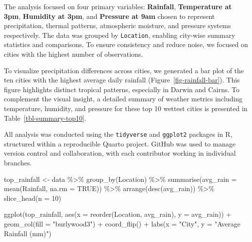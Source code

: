 \documentclass[
  letterpaper,
  DIV=11,
  numbers=noendperiod]{scrartcl}
\newenvironment{Shaded}{\begin{snugshade}}{\end{snugshade}}
\newcommand{\AttributeTok}[1]{\textcolor[rgb]{0.40,0.45,0.13}{#1}}
\newcommand{\ConstantTok}[1]{\textcolor[rgb]{0.56,0.35,0.01}{#1}}
\newcommand{\DecValTok}[1]{\textcolor[rgb]{0.68,0.00,0.00}{#1}}
\newcommand{\FunctionTok}[1]{\textcolor[rgb]{0.28,0.35,0.67}{#1}}
\newcommand{\NormalTok}[1]{\textcolor[rgb]{0.00,0.23,0.31}{#1}}
\newcommand{\OtherTok}[1]{\textcolor[rgb]{0.00,0.23,0.31}{#1}}
\newcommand{\SpecialCharTok}[1]{\textcolor[rgb]{0.37,0.37,0.37}{#1}}
\newcommand{\StringTok}[1]{\textcolor[rgb]{0.13,0.47,0.30}{#1}}
\begin{document}
The analysis focused on four primary variables: \textbf{Rainfall},
\textbf{Temperature at 3pm}, \textbf{Humidity at 3pm}, and
\textbf{Pressure at 9am} chosen to represent precipitation, thermal
patterns, atmospheric moisture, and pressure systems respectively. The
data was grouped by \texttt{Location}, enabling city-wise summary
statistics and comparisons. To ensure consistency and reduce noise, we
focused on cities with the highest number of observations.

To visualize precipitation differences across cities, we generated a bar
plot of the ten cities with the highest average daily rainfall
(Figure~\ref{fig-rainfall-bar}). This figure highlights distinct
tropical patterns, especially in Darwin and Cairns. To complement the
visual insight, a detailed summary of weather metrics including
temperature, humidity, and pressure for these top 10 wettest cities is
presented in Table~\ref{tbl-summary-top10}.

All analysis was conducted using the \texttt{tidyverse} and
\texttt{ggplot2} packages in R, structured within a reproducible Quarto
project. GitHub was used to manage version control and collaboration,
with each contributor working in individual branches.

\begin{Shaded}
\begin{Highlighting}[]
\NormalTok{top\_rainfall }\OtherTok{\textless{}{-}}\NormalTok{ data }\SpecialCharTok{\%\textgreater{}\%}
  \FunctionTok{group\_by}\NormalTok{(Location) }\SpecialCharTok{\%\textgreater{}\%}
  \FunctionTok{summarise}\NormalTok{(}\AttributeTok{avg\_rain =} \FunctionTok{mean}\NormalTok{(Rainfall, }\AttributeTok{na.rm =} \ConstantTok{TRUE}\NormalTok{)) }\SpecialCharTok{\%\textgreater{}\%}
  \FunctionTok{arrange}\NormalTok{(}\FunctionTok{desc}\NormalTok{(avg\_rain)) }\SpecialCharTok{\%\textgreater{}\%}
  \FunctionTok{slice\_head}\NormalTok{(}\AttributeTok{n =} \DecValTok{10}\NormalTok{)}

\FunctionTok{ggplot}\NormalTok{(top\_rainfall, }\FunctionTok{aes}\NormalTok{(}\AttributeTok{x =} \FunctionTok{reorder}\NormalTok{(Location, avg\_rain), }\AttributeTok{y =}\NormalTok{ avg\_rain)) }\SpecialCharTok{+}
  \FunctionTok{geom\_col}\NormalTok{(}\AttributeTok{fill =} \StringTok{"burlywood3"}\NormalTok{) }\SpecialCharTok{+}
  \FunctionTok{coord\_flip}\NormalTok{() }\SpecialCharTok{+}
  \FunctionTok{labs}\NormalTok{(}\AttributeTok{x =} \StringTok{"City"}\NormalTok{, }\AttributeTok{y =} \StringTok{"Average Rainfall (mm)"}\NormalTok{)}
\end{Highlighting}
\end{Shaded}
\end{document}
